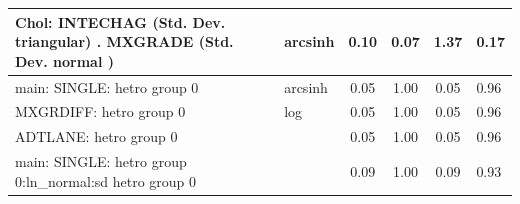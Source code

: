 \begin{table}
\begin{center}
\begin{tabular}{|l|l|c|c|c|l|}
			\hline
			 Chol: INTECHAG (Std. Dev. triangular) . MXGRADE (Std. Dev.   normal ) & arcsinh & 0.10 & 0.07 & 1.37 & 0.17 \\
			\hline
			main: SINGLE: hetro group 0 & arcsinh & 0.05 & 1.00 & 0.05 & 0.96 \\
			\hline
			MXGRDIFF: hetro group 0 & log & 0.05 & 1.00 & 0.05 & 0.96 \\
			\hline
			ADTLANE: hetro group 0 &  & 0.05 & 1.00 & 0.05 & 0.96 \\
			\hline
			main: SINGLE: hetro group 0:ln_normal:sd  hetro group 0 &  & 0.09 & 1.00 & 0.09 & 0.93 \\
			\hline
		\end{tabular}
	\end{center}
\end{table}
